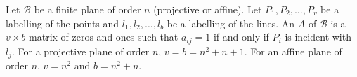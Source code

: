 Let $\mathcal{B}$ be a finite plane of order $n$ (projective or affine). Let $P_1, P_2, \dots, P_v$ be a labelling of the points and $l_1, l_2, \dots, l_b$ be a labelling of the lines. An  $A$ of $\mathcal{B}$ is a $v \times b$ matrix of zeros and ones such that $a_{ij} = 1$ if and only if $P_i$ is incident with $l_j$. For a projective plane of order $n$, $v = b = n^2 + n + 1$. For an affine plane of order $n$, $v = n^2$ and $b = n^2 + n$.
